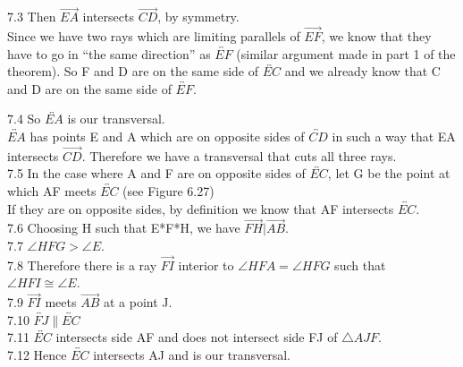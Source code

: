 \documentclass[12pt,letterpaper]{article}
\begin{document}
7.3 Then $\overrightarrow{EA}$ intersects $\overrightarrow{CD}$, by symmetry.\\

Since we have two rays which are limiting parallels of $\overrightarrow{EF}$, we know that they have to go in ``the same direction'' as $\overleftrightarrow{EF}$ (similar argument made in part 1 of the theorem).  So F and D are on the same side of $\overleftrightarrow{EC}$ and we already know that C and D are on the same side of $\overleftrightarrow{EF}$.  



7.4 So $\overleftrightarrow{EA}$ is our transversal.\\

$\overleftrightarrow{EA}$ has points E and A which are on opposite sides of $\overleftrightarrow{CD}$ in such a way that EA intersects $\overrightarrow{CD}$.  Therefore we have a transversal that cuts all three rays.\\


7.5 In the case where A and F are on opposite sides of $\overleftrightarrow{EC}$, let G be the point at which AF meets $\overleftrightarrow{EC}$ (see Figure 6.27)\\

If they are on opposite sides, by definition we know that AF intersects $\overleftrightarrow{EC}$.  \\



7.6 Choosing H such that E*F*H, we have $\overrightarrow{FH} | \overrightarrow{AB}$. \\ 




7.7 $\angle HFG > \angle E$. \\

7.8 Therefore there is a ray $\overrightarrow{FI}$ interior to $\angle HFA = \angle HFG$ such that $\angle HFI \cong \angle E$.  \\

7.9 $\overrightarrow{FI}$ meets $\overrightarrow{AB}$ at a point J. \\

7.10 $\overleftrightarrow{FJ} \parallel \overleftrightarrow{EC}$\\

7.11 $\overleftrightarrow{EC}$ intersects side AF and does not intersect side FJ of $\triangle AJF$. \\

7.12 Hence $\overleftrightarrow{EC}$ intersects AJ and is our transversal.\\
\end{document}
